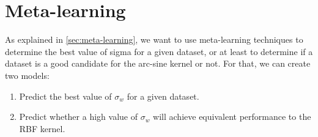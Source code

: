 %
%
%
\section{Meta-learning}

As explained in \cref{sec:meta-learning}, we want to use meta-learning
techniques to determine the best value of sigma for a given dataset, or at least
to determine if a dataset is a good candidate for the arc-sine kernel or not.
For that, we can create two models:
\begin{enumerate}
    \item Predict the best value of $\sigma_w$ for a given dataset.
    \item Predict whether a high value of $\sigma_w$ will achieve equivalent
          performance to the RBF kernel.
\end{enumerate}

